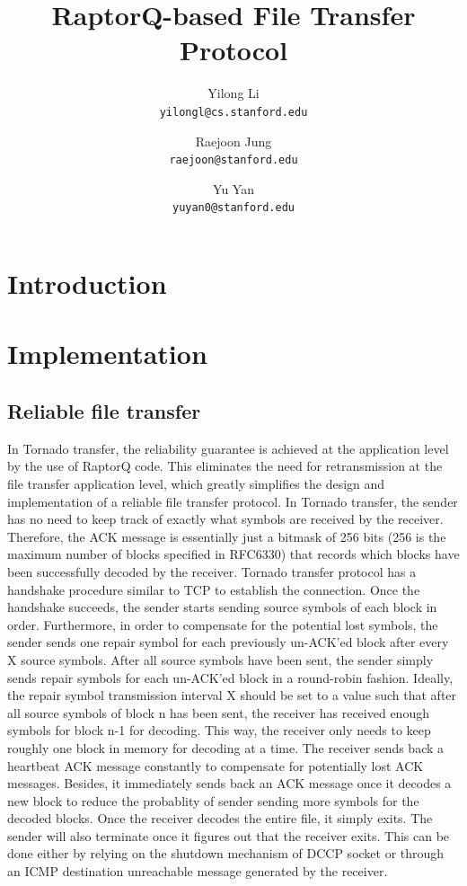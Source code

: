 \documentclass{sig-alternate-10pt}
\begin{document}
\title{RaptorQ-based File Transfer Protocol} 
\author{ 
Yilong Li\\
\texttt{yilongl@cs.stanford.edu} \and 
Raejoon Jung\\
\texttt{raejoon@stanford.edu} \and 
Yu Yan\\ 
\texttt{yuyan0@stanford.edu} 
}

\maketitle 

\section{Introduction}

\section{Implementation}

\subsection{Reliable file transfer} 

In Tornado transfer, the reliability guarantee is achieved at the application
level by the use of RaptorQ code. This eliminates the need for retransmission at
the file transfer application level, which greatly simplifies the design and
implementation of a reliable file transfer protocol. In Tornado transfer, the
sender has no need to keep track of exactly what symbols are received by the
receiver. Therefore, the ACK message is essentially just a bitmask of 256 bits
(256 is the maximum number of blocks specified in RFC6330) that records which
blocks have been successfully decoded by the receiver. Tornado transfer protocol
has a handshake procedure similar to TCP to establish the connection. Once the
handshake succeeds, the sender starts sending source symbols of each block in
order. Furthermore, in order to compensate for the potential lost symbols, the
sender sends one repair symbol for each previously un-ACK'ed block after every X
source symbols. After all source symbols have been sent, the sender simply sends
repair symbols for each un-ACK'ed block in a round-robin fashion. Ideally, the
repair symbol transmission interval X should be set to a value such that after
all source symbols of block n has been sent, the receiver has received enough
symbols for block n-1 for decoding. This way, the receiver only needs to keep
roughly one block in memory for decoding at a time. The receiver sends back a
heartbeat ACK message constantly to compensate for potentially lost ACK
messages. Besides, it immediately sends back an ACK message once it decodes a
new block to reduce the probablity of sender sending more symbols for the
decoded blocks. Once the receiver decodes the entire file, it simply exits. The
sender will also terminate once it figures out that the receiver exits. This can
be done either by relying on the shutdown mechanism of DCCP socket or through an
ICMP destination unreachable message generated by the receiver.
\end{document}
